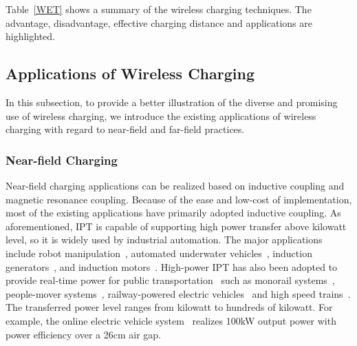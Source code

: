 \documentclass[twocolumn,10pt]{IEEEtran}
\begin{document}
Table~\ref{WET} shows a summary of the wireless charging techniques. The advantage, disadvantage, effective charging distance and applications are highlighted.


 
\subsection{Applications of Wireless Charging}
In this subsection, to provide a better illustration of the diverse and promising use of wireless charging, we introduce the existing applications of wireless charging with regard to near-field and far-field practices.   

\subsubsection{Near-field Charging}

 

Near-field charging applications can be realized based on inductive coupling and magnetic resonance coupling. Because of the ease and low-cost of implementation, most of the existing applications have primarily adopted inductive coupling. As aforementioned, IPT is capable of supporting high power transfer above kilowatt level, so it is widely used by industrial automation. The major applications include robot manipulation~\cite{J.2007Gao,A.1996Kawamura}, automated underwater vehicles~\cite{T.2007McGinnis,Z.2015Cheng,F.2012Tang}, induction generators~\cite{H.2014Gorginpour}, and induction motors~\cite{H.2014Guzman,Y.2014Liang,A.2014Mahmoudi}.
High-power IPT has also been adopted to provide real-time power for public transportation~\cite{A2013Covic} such as monorail systems~\cite{S.2008Raabe,J.2006Elliott,A.2010Keeling}, people-mover systems~\cite{M.2008Jufer}, railway-powered electric vehicles~\cite{J.2014Shin,A.2007Covic,Y.2015Choi,A.2013Russer} and high speed trains~\cite{J.2015Kim,S.2012Lee}. The transferred power level ranges from kilowatt to hundreds of kilowatt. 
For example, the online electric vehicle system~\cite{J.2014Shin,Y.2012Chun} realizes 100kW output power with  power efficiency over a 26cm air gap.
\end{document}
